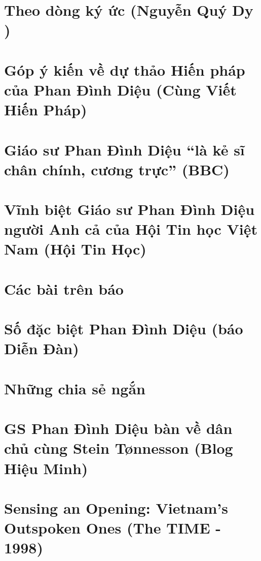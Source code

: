 \documentclass[11pt,twoside]{extreport}
\begin{document}
\chapter{Theo dòng ký ức (Nguyễn Quý Dy )}



\chapter{Góp ý kiến về dự thảo Hiến pháp của Phan Đình Diệu (Cùng Viết Hiến Pháp)}



\chapter{Giáo sư Phan Đình Diệu ``là kẻ sĩ chân chính, cương trực'' (BBC)}


\chapter{Vĩnh biệt Giáo sư Phan Đình Diệu người Anh cả của Hội Tin học Việt Nam  (Hội Tin Học)}


\chapter{Các bài trên báo}



\chapter{Số đặc biệt Phan Đình Diệu (báo Diễn Đàn)}



\chapter{Những chia sẻ ngắn }


\chapter{GS Phan Đình Diệu bàn về dân chủ cùng Stein Tønnesson (Blog Hiệu Minh)}



\chapter{Sensing an Opening: Vietnam’s Outspoken Ones (The TIME - 1998)}

\end{document}
